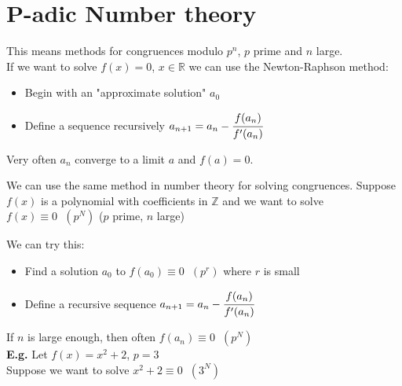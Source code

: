 \documentclass[11pt]{article}
\begin{document}
\newpage
\section{P-adic Number theory}
This means methods for congruences modulo $p^n$, $p$ prime and $n$ large.\\[1em]

If we want to solve $f(x)=0$, $x \in \mathbb{R}$ we can use the Newton-Raphson method:
\begin{itemize}
	\item{Begin with an "approximate solution" $a_0$}
	\item{Define a sequence recursively $a_{n+1} = a_n - \cfrac{f(a_n)}{f'(a_n)}$}
\end{itemize}
Very often $a_n$ converge to a limit $a$ and $f(a) = 0$.

We can use the same method in number theory for solving congruences. Suppose $f(x)$ is a polynomial with coefficients in $\mathbb{Z}$ and we want to solve $f(x)\equiv 0 \hspace{7pt} (p^N)$ ($p$ prime, $n$ large)

We can try this:
\begin{itemize}
	\item{Find a solution $a_0$ to $f(a_0) \equiv 0 \hspace{7pt} (p^r)$ where $r$ is small}
	\item{Define a recursive sequence $a_{n+1} = a_n - \cfrac{f(a_n)}{f'(a_n)}$}
\end{itemize}
If $n$ is large enough, then often $f(a_n) \equiv 0\hspace{7pt} (p^N)$\\[1em]

\textbf{E.g.} Let $f(x) = x^2 + 2$, $p=3$\\
Suppose we want to solve $x^2 +2 \equiv 0 \hspace{7pt} (3^N)$ \\[0.5em]
\end{document}
